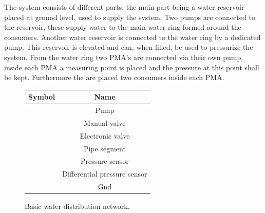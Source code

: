The system consists of different parts, the main part being a water reservoir placed at ground level, used to supply the system. Two pumps are connected to the reservoir, these supply water to the main water ring formed around the consumers. 
Another water reservoir is connected to the water ring by a dedicated pump. This reservoir is elevated and can, when filled, be used to pressurize the system. 
From the water ring two PMA's are connected via their own pump, inside each PMA a measuring point is placed and the pressure at this point shall be kept. Furthermore the are placed two consumers inside each PMA.         
	
\begin{figure}
	\centering
	\begin{minipage}[b]{0.4\textwidth}
		\centering
		 
		\caption{Basic water distribution network.}
		\label{fig:Basic_example_sys}
	\end{minipage}
	\hspace{15pt}
	\begin{minipage}[b]{0.4\textwidth}
		\begin{tabular}{|c|c|} \hline
  			\bfseries Symbol 	 					&   \bfseries Name 					\\ \hline
			 		  	&	Pump							\\ \hline
			 	&	Manual valve					\\ \hline
			 		&	Electronic valve				\\ \hline
			 		  	&	Pipe segment					\\ \hline
			 &	Pressure sensor					\\ \hline
			 	&	Differential pressure sensor	\\ \hline
			 		  	&	Gnd								\\ \hline
		\end{tabular}
		\label{tab:sys_comp_overview}
	\end{minipage}
\end{figure}
